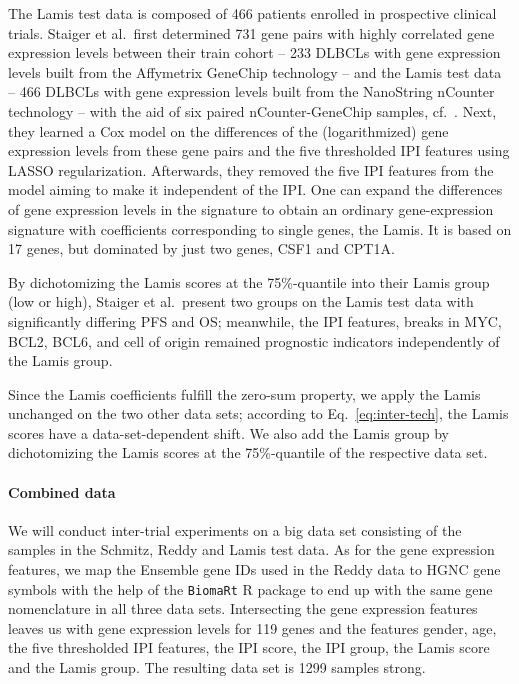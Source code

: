 The Lamis test data is composed of \num{466} patients enrolled in prospective clinical trials. 
Staiger et al.\ first determined \num{731} gene pairs with highly correlated gene expression levels 
between their train cohort -- \num{233} DLBCLs with gene expression levels built from the Affymetrix 
GeneChip technology -- and the Lamis test data -- \num{466} DLBCLs with gene expression levels built 
from the NanoString nCounter technology -- with the aid of six paired nCounter-GeneChip samples, cf.\ 
\cite[Supplementary Methods]{staiger20}.
Next, they learned a Cox model on the differences of the (logarithmized) gene expression levels 
from these gene pairs and the five thresholded IPI features using LASSO regularization. 
Afterwards, they removed the five IPI features from the model aiming to make it independent of the 
IPI. One can expand the differences of gene expression levels in the signature to obtain an ordinary 
gene-expression signature with coefficients corresponding to single genes, the Lamis. It is 
based on \num{17} genes, but dominated by just two genes, CSF1 and CPT1A. 

By dichotomizing the 
Lamis scores at the 75\%-quantile into their Lamis group (low or high), Staiger et al.\ present two 
groups on the Lamis test data with significantly differing PFS and OS; 
meanwhile, the IPI features, breaks in MYC, BCL2, BCL6, and cell of origin remained prognostic 
indicators independently of the Lamis group.

Since the Lamis coefficients fulfill the 
zero-sum property, we apply the Lamis unchanged on the two other data sets; according to Eq.\ 
\eqref{eq:inter-tech}, the Lamis scores have a data-set-dependent shift. We also add the Lamis 
group by dichotomizing the Lamis scores at the 75\%-quantile of the respective data set.

\paragraph{Combined data}

We will conduct inter-trial experiments on a big data set consisting of the samples in the Schmitz, 
Reddy and Lamis test data. As for the gene expression features, we map the Ensemble gene IDs used 
in the Reddy data to HGNC gene symbols with the help of the \texttt{BiomaRt} R package \cite{biomart}
to end up with the same gene nomenclature in all three data sets. Intersecting the gene expression 
features leaves us with gene expression levels for \num{119} genes and the features gender, age, 
the five thresholded IPI features, the IPI score, the IPI group, the Lamis score and the Lamis 
group. The resulting data set is \num{1299} samples strong.

